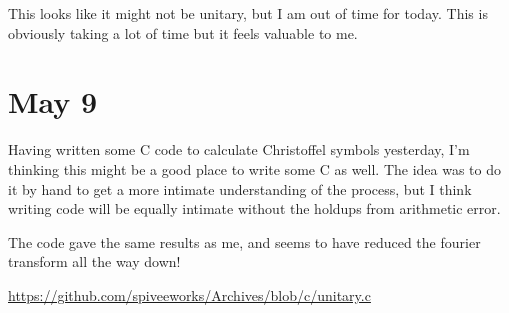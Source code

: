 \documentclass[]{article}
\begin{document}
This looks like it might not be unitary, but I am out of time for today.
This is obviously taking a lot of time but it feels valuable to me.

\section{May 9}

Having written some C code to calculate Christoffel symbols yesterday, I'm thinking this might be a good place to write some C as well. The idea was to do it by hand to get a more intimate understanding of the process, but I think writing code will be equally intimate without the holdups from arithmetic error.

The code gave the same results as me, and seems to have reduced the fourier transform all the way down!

\url{https://github.com/spiveeworks/Archives/blob/c/unitary.c}
\end{document}
